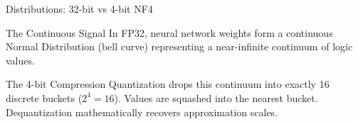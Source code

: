 \documentclass[aspectratio=169]{beamer}
\begin{document}
\begin{frame}{Distributions: 32-bit vs 4-bit NF4}
    \begin{block}{The Continuous Signal}
        In FP32, neural network weights form a continuous Normal Distribution (bell curve) representing a near-infinite continuum of logic values.
    \end{block}
    \begin{block}{The 4-bit Compression}
        Quantization drops this continuum into exactly 16 discrete buckets ($2^4 = 16$).
        Values are squashed into the nearest bucket. Dequantization mathematically recovers approximation scales.
    \end{block}
\end{frame}

\end{document}
